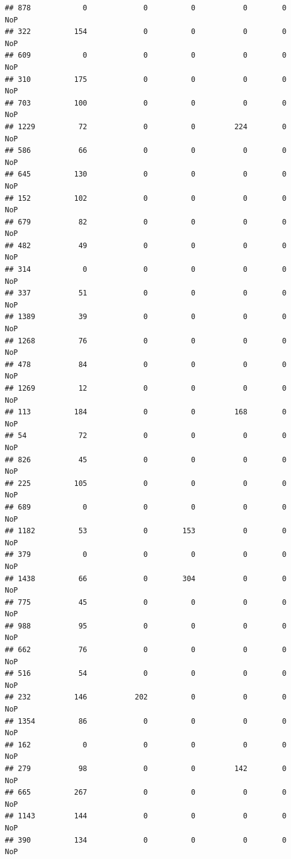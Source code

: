 \documentclass[]{article}
\begin{document}
\begin{verbatim}
## 878            0             0          0           0        0    NoP
## 322          154             0          0           0        0    NoP
## 609            0             0          0           0        0    NoP
## 310          175             0          0           0        0    NoP
## 703          100             0          0           0        0    NoP
## 1229          72             0          0         224        0    NoP
## 586           66             0          0           0        0    NoP
## 645          130             0          0           0        0    NoP
## 152          102             0          0           0        0    NoP
## 679           82             0          0           0        0    NoP
## 482           49             0          0           0        0    NoP
## 314            0             0          0           0        0    NoP
## 337           51             0          0           0        0    NoP
## 1389          39             0          0           0        0    NoP
## 1268          76             0          0           0        0    NoP
## 478           84             0          0           0        0    NoP
## 1269          12             0          0           0        0    NoP
## 113          184             0          0         168        0    NoP
## 54            72             0          0           0        0    NoP
## 826           45             0          0           0        0    NoP
## 225          105             0          0           0        0    NoP
## 689            0             0          0           0        0    NoP
## 1182          53             0        153           0        0    NoP
## 379            0             0          0           0        0    NoP
## 1438          66             0        304           0        0    NoP
## 775           45             0          0           0        0    NoP
## 988           95             0          0           0        0    NoP
## 662           76             0          0           0        0    NoP
## 516           54             0          0           0        0    NoP
## 232          146           202          0           0        0    NoP
## 1354          86             0          0           0        0    NoP
## 162            0             0          0           0        0    NoP
## 279           98             0          0         142        0    NoP
## 665          267             0          0           0        0    NoP
## 1143         144             0          0           0        0    NoP
## 390          134             0          0           0        0    NoP

\end{verbatim}
\end{document}
